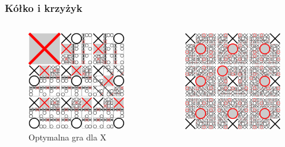 \documentclass[polish,envcountsect,10pt]{beamer}
\begin{document}
                \begin{frame}
                    \frametitle{Kółko i krzyżyk}
                    \begin{columns}
                        \begin{figure}[H]
                            \centering
                            \includegraphics[width=\textwidth,natwidth=480,natheight=480]{images/480px-Tictactoe-X.svg.png}
                            \caption{Optymalna gra dla X}
                        \end{figure}
                        \begin{figure}[H]
                            \centering
                            \includegraphics[width=\textwidth,natwidth=480,natheight=480]{images/480px-Tictactoe-O.svg.png}

\end{figure}
\end{columns}
\end{frame}
\end{document}
